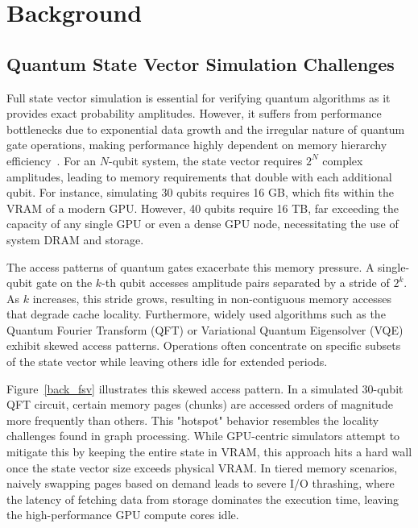 \section{Background}

\subsection{Quantum State Vector Simulation Challenges}\label{2.1}
Full state vector simulation is essential for verifying quantum algorithms as it provides exact probability amplitudes. However, it suffers from performance bottlenecks due to exponential data growth and the irregular nature of quantum gate operations, making performance highly dependent on memory hierarchy efficiency~\cite{qsim, svsim}. For an $N$-qubit system, the state vector requires $2^N$ complex amplitudes, leading to memory requirements that double with each additional qubit. For instance, simulating 30 qubits requires 16 GB, which fits within the VRAM of a modern GPU. However, 40 qubits require 16 TB, far exceeding the capacity of any single GPU or even a dense GPU node, necessitating the use of system DRAM and storage.

The access patterns of quantum gates exacerbate this memory pressure. A single-qubit gate on the $k$-th qubit accesses amplitude pairs separated by a stride of $2^k$. As $k$ increases, this stride grows, resulting in non-contiguous memory accesses that degrade cache locality. Furthermore, widely used algorithms such as the Quantum Fourier Transform (QFT) or Variational Quantum Eigensolver (VQE) exhibit skewed access patterns. Operations often concentrate on specific subsets of the state vector while leaving others idle for extended periods.

Figure~\ref{back_fsv} illustrates this skewed access pattern. In a simulated 30-qubit QFT circuit, certain memory pages (chunks) are accessed orders of magnitude more frequently than others. This "hotspot" behavior resembles the locality challenges found in graph processing. While GPU-centric simulators attempt to mitigate this by keeping the entire state in VRAM, this approach hits a hard wall once the state vector size exceeds physical VRAM. In tiered memory scenarios, naively swapping pages based on demand leads to severe I/O thrashing, where the latency of fetching data from storage dominates the execution time, leaving the high-performance GPU compute cores idle.


